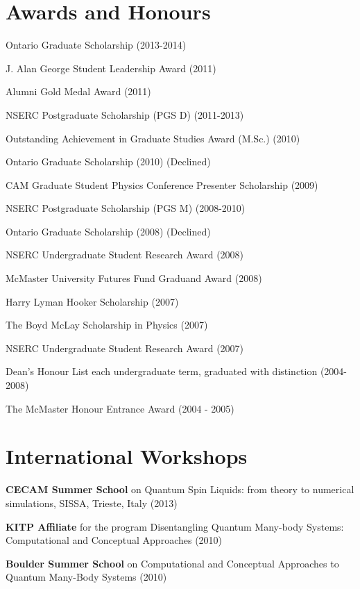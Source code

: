 \documentclass[letterpaper]{article}
\renewenvironment{itemize}{
  \begin{list}{}{
    \setlength{\leftmargin}{1.5em}
  }
}{
  \end{list}
}
\begin{document}
\section*{Awards and Honours}

\begin{itemize}

\item Ontario Graduate Scholarship (2013-2014)
\item J. Alan George Student Leadership Award (2011)
\item Alumni Gold Medal Award (2011)
\item NSERC Postgraduate Scholarship (PGS D) (2011-2013)
\item Outstanding Achievement in Graduate Studies Award (M.Sc.) (2010)
\item Ontario Graduate Scholarship (2010) (Declined)
\item CAM Graduate Student Physics Conference Presenter Scholarship (2009)
\item NSERC Postgraduate Scholarship (PGS M) (2008-2010)
\item Ontario Graduate Scholarship (2008) (Declined)
\item NSERC Undergraduate Student Research Award (2008)
\item McMaster University Futures Fund Graduand Award (2008)
\item Harry Lyman Hooker Scholarship (2007)
\item The Boyd McLay Scholarship in Physics (2007)
\item NSERC Undergraduate Student Research Award (2007)
\item Dean's Honour List each undergraduate term, graduated with distinction (2004-2008)
\item The McMaster Honour Entrance Award (2004 - 2005)
\end{itemize}

\section*{International Workshops}

\begin{itemize}

\item {\bf CECAM Summer School} on Quantum Spin Liquids: from theory to numerical simulations, SISSA, Trieste, Italy (2013)

\item {\bf KITP Affiliate} for the program Disentangling Quantum Many-body Systems: Computational and Conceptual Approaches (2010)

\item {\bf Boulder Summer School} on Computational and Conceptual Approaches
to Quantum Many-Body Systems (2010)

\end{itemize}
\end{document}
